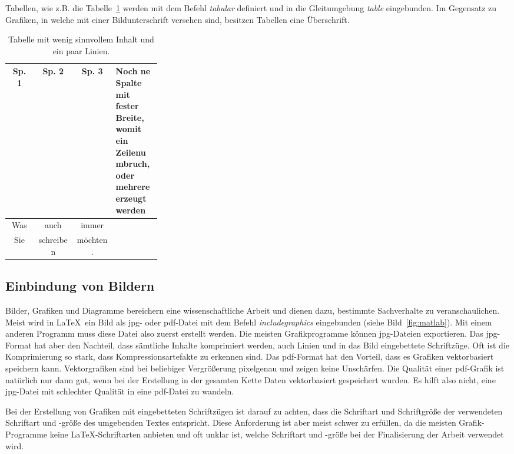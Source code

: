 Tabellen, wie z.B. die Tabelle~\ref{tab:tabbsp} werden mit dem Befehl \textit{tabular} definiert und in die Gleitumgebung \textit{table} eingebunden. Im Gegensatz zu Grafiken, in welche mit einer Bildunterschrift versehen sind, besitzen Tabellen eine Überschrift.

\begin{table}[hbt]
	\caption{Tabelle mit wenig sinnvollem Inhalt und ein paar Linien.}
	\centering
	\begin{tabular}{|cc|c p{0.3\linewidth}} %
		\textbf{Sp. 1 }& \textbf{Sp. 2} & \textbf{Sp. 3} &\textbf{Noch \grq ne Spalte mit fester Breite, womit ein Zeilenumbruch, oder mehrere erzeugt werden}\\
		\hline 
		\hline 
		Was & auch & immer & \\ 
		\hline 
		Sie & schreiben & möchten. &\\ 
		\hline 
	\end{tabular} 
	\label{tab:tabbsp}
\end{table}



\subsection{Einbindung von Bildern}

Bilder, Grafiken und Diagramme bereichern eine wissenschaftliche Arbeit und dienen dazu, bestimmte Sachverhalte zu veranschaulichen. Meist wird in \LaTeX~ein Bild als jpg- oder pdf-Datei mit dem Befehl \textit{includegraphics} eingebunden (siehe Bild~\ref{fig:matlab}). Mit einem anderen Programm muss diese Datei also zuerst erstellt werden. Die meisten Grafikprogramme können jpg-Dateien exportieren. Das jpg-Format hat aber den Nachteil, dass sämtliche Inhalte komprimiert werden, auch Linien und in das Bild eingebettete Schriftzüge. Oft ist die Komprimierung so stark, dass Kompressionsartefakte zu erkennen sind. Das pdf-Format hat den Vorteil, dass es Grafiken vektorbasiert speichern kann. Vektorgrafiken sind bei beliebiger Vergrößerung pixelgenau und zeigen keine Unschärfen. Die Qualität einer pdf-Grafik ist natürlich nur dann gut, wenn bei der Erstellung in der gesamten Kette Daten vektorbasiert gespeichert wurden. Es hilft also nicht, eine jpg-Datei mit schlechter Qualität in eine pdf-Datei zu wandeln.

Bei der Erstellung von Grafiken mit eingebetteten Schriftzügen ist darauf zu achten, dass die Schriftart und Schriftgröße der verwendeten Schriftart und -größe des umgebenden Textes entspricht. Diese Anforderung ist aber meist schwer zu erfüllen, da die meisten Grafik-Programme keine \LaTeX-Schriftarten anbieten und oft unklar ist, welche Schriftart und -größe bei der Finalisierung der Arbeit verwendet wird.

